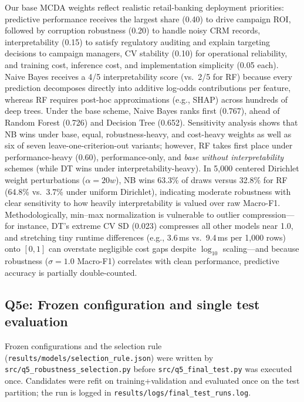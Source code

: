 Our base MCDA weights reflect realistic retail-banking deployment priorities: predictive performance receives the largest share (0.40) to drive campaign ROI, followed by corruption robustness (0.20) to handle noisy CRM records, interpretability (0.15) to satisfy regulatory auditing and explain targeting decisions to campaign managers, CV stability (0.10) for operational reliability, and training cost, inference cost, and implementation simplicity (0.05 each). Naive Bayes receives a 4/5 interpretability score (vs.\ 2/5 for RF) because every prediction decomposes directly into additive log-odds contributions per feature, whereas RF requires post-hoc approximations (e.g., SHAP) across hundreds of deep trees. Under the base scheme, Naive Bayes ranks first (0.767), ahead of Random Forest (0.726) and Decision Tree (0.652). Sensitivity analysis shows that NB wins under base, equal, robustness-heavy, and cost-heavy weights as well as six of seven leave-one-criterion-out variants; however, RF takes first place under performance-heavy (0.60), performance-only, and \emph{base without interpretability} schemes (while DT wins under interpretability-heavy). In 5,000 centered Dirichlet weight perturbations ($\alpha = 20w$), NB wins 63.3\% of draws versus 32.8\% for RF (64.8\% vs.\ 3.7\% under uniform Dirichlet), indicating moderate robustness with clear sensitivity to how heavily interpretability is valued over raw Macro-F1. Methodologically, min--max normalization is vulnerable to outlier compression---for instance, DT's extreme CV SD (0.023) compresses all other models near 1.0, and stretching tiny runtime differences (e.g., 3.6\,ms vs.\ 9.4\,ms per 1,000 rows) onto $[0,1]$ can overstate negligible cost gaps despite $\log_{10}$ scaling---and because robustness ($\sigma=1.0$ Macro-F1) correlates with clean performance, predictive accuracy is partially double-counted.

\subsection{Q5e: Frozen configuration and single test evaluation}
Frozen configurations and the selection rule (\texttt{results/models/selection\_rule.json}) were written by
\texttt{src/q5\_robustness\_selection.py} before \texttt{src/q5\_final\_test.py} was executed once. Candidates were
refit on training+validation and evaluated once on the test partition; the run is logged in
\texttt{results/logs/final\_test\_runs.log}.

